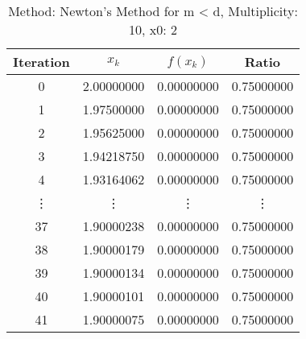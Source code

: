 \begin{table}
\centering
\caption{Method: Newton's Method for m < d, Multiplicity: 10, x0: 2}
\label{tab:table_Newton's_Method_for_m_<_d_10_2}
\begin{tabular}{c c c c}
\toprule
Iteration &      $x_k$ &   $f(x_k)$ &      Ratio \\
\midrule
        0 & 2.00000000 & 0.00000000 & 0.75000000 \\
        1 & 1.97500000 & 0.00000000 & 0.75000000 \\
        2 & 1.95625000 & 0.00000000 & 0.75000000 \\
        3 & 1.94218750 & 0.00000000 & 0.75000000 \\
        4 & 1.93164062 & 0.00000000 & 0.75000000 \\
   \vdots &     \vdots &     \vdots &     \vdots \\
       37 & 1.90000238 & 0.00000000 & 0.75000000 \\
       38 & 1.90000179 & 0.00000000 & 0.75000000 \\
       39 & 1.90000134 & 0.00000000 & 0.75000000 \\
       40 & 1.90000101 & 0.00000000 & 0.75000000 \\
       41 & 1.90000075 & 0.00000000 & 0.75000000 \\
\bottomrule
\end{tabular}
\end{table}
